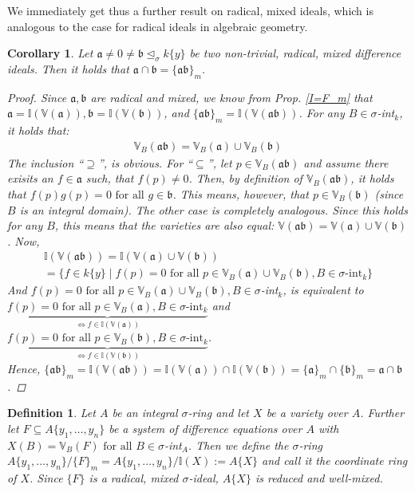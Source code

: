 \documentclass{article}
\def\I{\mathbb{I}}
\def\VV{\mathbb{V}}
\def\a{\mathfrak{a}}
\def\b{\mathfrak{b}}
\def\s{\sigma}
\def\si{\unlhd_{\sigma}}
\def\fa{\text{ for all }}
\newenvironment{bew}{\begin{proof}[Proof]}{\end{proof}}
\theoremstyle{plain}
\newtheorem{cor}[Satz]{Corollary}
\newtheorem{defn}[Satz]{Definition}
\theoremstyle{definition}
\begin{document}
We immediately get thus a further result on radical, mixed ideals, which is analogous to the case for radical ideals in algebraic geometry.
\begin{cor}\label{prod=cap}
Let $\a \neq 0 \neq \b \si k\{y\}$ be two non-trivial, radical, mixed difference ideals. Then it holds that $\a \cap \b = \{ \a \b \}_m$.
\begin{bew}
Since $\a, \b$ are radical and mixed, we know from Prop. \ref{I=F_m} that $\a = \I(\VV(\a)), \b = \I(\VV(\b))$, and $\{ \a \b \}_m = \I( \VV( \a \b ))$.
For any $B \in \s$-int$_k$, it holds that:
\begin{align*} \VV_B( \a \b) = \VV_B( \a) \cup \VV_B( \b) \end{align*}
The inclusion ``$\supseteq$'', is obvious. For ``$\subseteq$'', let $p \in \VV_B(\a\b)$ and assume there exisits an $f \in \a$ such, that $f(p) \neq 0$.
Then, by definition of $\VV_B(\a\b)$, it holds that $f(p)g(p) = 0 \fa g \in \b$. This means, however, that $p \in \VV_B(\b)$ (since $B$ is an integral domain). The other case is completely analogous.
Since this holds for any $B$, this means that the varieties are also equal: $\VV( \a \b) = \VV( \a) \cup \VV( \b)$. Now,
\begin{align*} \I(\VV(\a \b)) = \I(\VV(\a) \cup \VV(\b)) \\ = \{ f \in k\{y\} \mid f(p) = 0 \fa p \in \VV_B(\a) \cup \VV_B(\b), B \in \s\text{-int}_k \} \end{align*}
And $f(p) = 0 \fa p \in \VV_B(\a) \cup \VV_B(\b), B \in \s$-int$_k$, is equivalent to \\
$ \underbrace{f(p) = 0 \fa p \in \VV_B(\a), B \in \s\text{-int}_k}_{\Leftrightarrow f \in \I(\VV(\a))}$ and $ \underbrace{f(p) = 0 \fa p \in \VV_B(\b), B \in \s\text{-int}_k}_{\Leftrightarrow f \in \I(\VV(\b))}$. \\
Hence, $\{\a\b\}_m = \I(\VV( \a \b)) = \I(\VV(\a)) \cap \I(\VV(\b)) = \{\a\}_m \cap \{\b\}_m = \a \cap \b$.
\end{bew}
\end{cor}

\begin{defn}
Let $A$ be an integral $\s$-ring and let $X$ be a variety over $A$. Further let $F \subseteq A\{y_1, \ldots, y_n\}$ be a system of difference equations over $A$ with $X(B) = \VV_B(F) \fa B \in \s$-int$_A$.
Then we define the $\s$-ring $A\{y_1, \ldots, y_n\}/\{F\}_m = A\{y_1, \ldots, y_n\}/\I(X) := A\{X\}$ and call it the coordinate ring of $X$. Since $\{F\}$ is a radical, mixed $\s$-ideal, $A\{X\}$ is reduced and well-mixed.
\end{defn}
\end{document}
